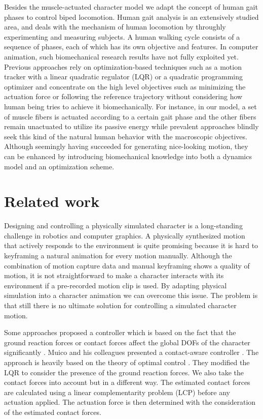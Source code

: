 \documentclass{acm_proc_article-sp}
\begin{document}
Besides the muscle-actuated character model we adapt the concept of
human gait phases to control biped locomotion. Human gait analysis is an extensively
studied area, and deals with the mechanism of human locomotion
by throughly experimenting and measuring subjects.
A human walking cycle consists of a sequence of phases, each of which has
its own objective and features.
In computer animation, such biomechanical research results have not fully exploited yet.
Previous approaches rely on optimization-based
techniques such as a motion tracker with a linear quadratic regulator (LQR)
or a quadratic programming optimizer and concentrate on the high level
objectives such as minimizing the actuation force or following the reference
trajectory without considering how human being tries
to achieve it biomechanically. For instance, in our model, a set of muscle fibers is
actuated according to a certain gait phase and the other fibers remain
unactuated to utilize its passive energy while prevalent approaches blindly seek
this kind of the natural human behavior with the macroscopic objectives.
Although seemingly having succeeded for generating nice-looking motion,
they can be enhanced by introducing biomechanical knowledge into both
a dynamics model and an optimization scheme.

\section{Related work}
Designing and controlling a physically simulated character is a long-standing
challenge in robotics and computer graphics. A physically
synthesized motion that actively responds to the environment is quite
promising because it is hard to keyframing a natural animation for every motion
manually. Although the combination of motion capture data and manual keyframing
shows a quality of motion, it is not straightforward to make a character
interacts with its environment if a pre-recorded motion clip is used.
By adapting physical simulation into a character animation we can overcome
this issue. The problem is that still there is no ultimate solution for controlling
a simulated character motion.

Some approaches proposed a controller which is based on the fact
that the ground reaction forces or contact forces affect the global
DOFs of the character significantly \cite{SCA07:249-258:2007, journals/tog/MuicoLPP09}.
Muico and his colleagues
presented a contact-aware controller \cite{journals/tog/MuicoLPP09}.
The approach is
heavily based on the theory of optimal control \cite{lewis}.
They modified the LQR to consider the presence of the ground reaction forces.
We also take the contact forces into account but in a different way.
The estimated contact forces are calculated using a linear complementarity
problem (LCP) before any actuation applied. The actuation force is then
determined with the consideration of the estimated contact forces.
\end{document}
